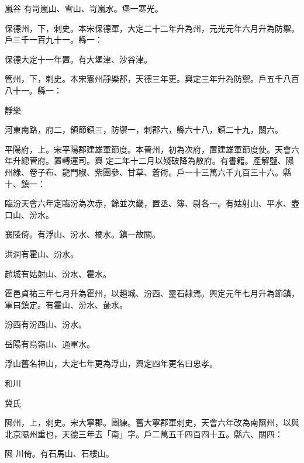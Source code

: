 \begin{pinyinscope}
 嵐谷
 有岢嵐山、雪山、岢嵐水。堡一寒光。



 保德州，下，刺史。本宋保德軍，大定二十二年升為州，元光元年六月升為防禦。戶三千一百九十一。縣一：



 保德大定十一年置。有大堡津、沙谷津。



 管州，下，刺史。本宋憲州靜樂郡，天德三年更。興定三年升為防禦。戶五千八百八十一。縣一：



 靜樂



 河東南路，府二，領節鎮三，防禦一，刺郡六，縣六十八，鎮二十九，關六。



 平陽府，上。宋平陽郡建雄軍節度。本晉州，初為次府，置建雄軍節度使。天會六年升總管府。置轉運司。興
 定二年十二月以殘破降為散府。有書籍。產解鹽、隰州綠、卷子布、龍門椒、紫團參、甘草、蒼術。戶一十三萬六千九百三十六。縣十、鎮一：



 臨汾天會六年定臨汾為次赤，餘並次畿，置丞、簿、尉各一。有姑射山、平水、壺口山、汾水。



 襄陵倚。有浮山、汾水、橘水。鎮一故關。



 洪洞有霍山、汾水。



 趙城有姑射山、汾水、霍水。



 霍邑貞祐三年七月升為霍州，以趙城、汾西、靈石隸焉。興定元年七月升為節鎮，軍曰鎮定。有霍山、汾水、彘水。



 汾西有汾西山、汾水。



 岳陽有烏嶺山、通軍水。



 浮山舊名神山，大定七年更為浮山，興定四年更名曰忠孝。



 和川



 冀氏



 隰州，上，刺史。宋大寧郡。團練。舊大寧郡軍刺史，天會六年改為南隰州，以與北京隰州重也，天德三年去「南」字。戶二萬五千四百四十五。縣六、關四：



 隰
 川倚。有石馬山、石樓山。




\end{pinyinscope}
